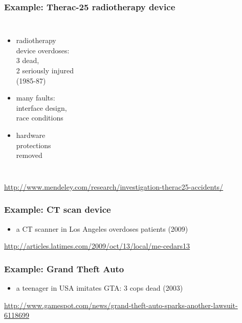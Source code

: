 \documentclass[dvipsnames]{beamer}
\theoremstyle{plain}
\begin{document}
\begin{frame}
  \frametitle{Example: Therac-25 radiotherapy device}

  \begin{columns}

    \begin{itemize}
      \item radiotherapy\\
        device overdoses:\\
        3 dead,\\
        2 seriously injured\\
        (1985-87)

      \item many faults:\\
        interface design,\\
        race conditions
      \item hardware\\
        protections\\
        removed
    \end{itemize}
  \end{columns}

  \medskip
  \tiny{\url{http://www.mendeley.com/research/investigation-therac25-accidents/}}\\
\end{frame}

\begin{frame}
  \frametitle{Example: CT scan device}

  \begin{center}
  \end{center}

  \begin{itemize}
    \item a CT scanner in Los Angeles overdoses patients (2009)
  \end{itemize}

  \medskip
  \tiny{\url{http://articles.latimes.com/2009/oct/13/local/me-cedars13}}\\
\end{frame}

\begin{frame}
  \frametitle{Example: Grand Theft Auto}

  \begin{center}
  \end{center}

  \begin{itemize}
    \item a teenager in USA imitates GTA: 3 cops dead (2003)
  \end{itemize}

  \medskip
  \tiny{\url{http://www.gamespot.com/news/grand-theft-auto-sparks-another-lawsuit-6118699}}\\
\end{frame}
\end{document}
